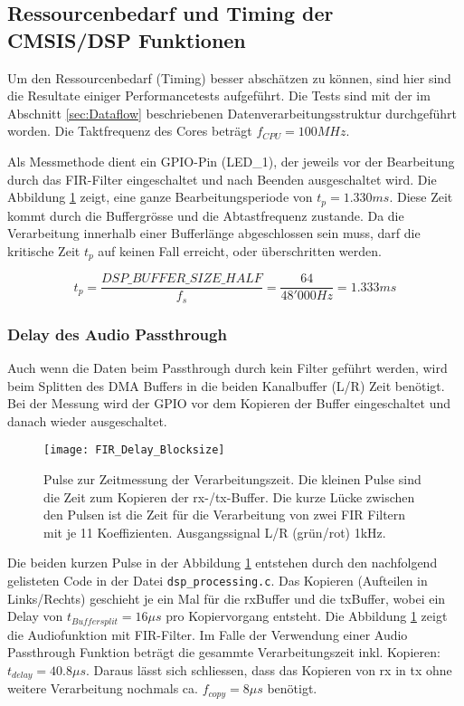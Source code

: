 \subsection{Ressourcenbedarf und Timing der CMSIS/DSP Funktionen}
\label{sec:DSP_Timing}

Um den Ressourcenbedarf (Timing) besser abschätzen zu können, sind hier sind die Resultate einiger Performancetests aufgeführt.
Die Tests sind mit der im Abschnitt \ref{sec:Dataflow} beschriebenen Datenverarbeitungsstruktur durchgeführt worden.
Die Taktfrequenz des Cores beträgt $f_{CPU}=100\si{MHz}$.

Als Messmethode dient ein GPIO-Pin (LED\_1), der jeweils vor der Bearbeitung durch das FIR-Filter eingeschaltet und nach Beenden ausgeschaltet wird. 
Die Abbildung \ref{pic:FIR_Delay_Blocksize} zeigt, eine ganze Bearbeitungsperiode von $t_p=1.330\si{ms}$.
Diese Zeit kommt durch die Buffergrösse und die Abtastfrequenz zustande.
Da die Verarbeitung innerhalb einer Bufferlänge abgeschlossen sein muss, darf die 
kritische Zeit $t_p$ auf keinen Fall erreicht, oder überschritten werden.

\begin{equation}
	t_p=\frac{DSP\_BUFFER\_SIZE\_HALF}{f_s}=\frac{64}{48'000\si{Hz}}=1.333\si{ms}
\end{equation}


\subsubsection{Delay des Audio Passthrough}

Auch wenn die Daten beim Passthrough durch kein Filter geführt werden, wird beim Splitten des DMA Buffers in die beiden Kanalbuffer (L/R) Zeit benötigt.
Bei der Messung wird der GPIO vor dem Kopieren der Buffer eingeschaltet und danach wieder ausgeschaltet.

\begin{figure}[H]
	\centering
	\texttt{[image: FIR\_Delay\_Blocksize]}
	\caption{Pulse zur Zeitmessung der Verarbeitungszeit. Die kleinen Pulse sind die Zeit zum Kopieren der rx-/tx-Buffer. Die kurze Lücke zwischen den Pulsen ist die Zeit für die Verarbeitung von zwei FIR Filtern mit je 11 Koeffizienten. Ausgangssignal L/R (grün/rot) 1kHz.}
	\label{pic:FIR_Delay_Blocksize}
\end{figure}

Die beiden kurzen Pulse in der Abbildung \ref{pic:FIR_Delay_Blocksize} entstehen durch den nachfolgend gelisteten Code in der Datei \texttt{dsp\_processing.c}.
Das Kopieren (Aufteilen in Links/Rechts) geschieht je ein Mal für die rxBuffer und die txBuffer, wobei ein Delay von $t_{Buffersplit}=16\mu\si{s}$ pro Kopiervorgang entsteht.
Die Abbildung \ref{pic:FIR_Delay_Blocksize} zeigt die Audiofunktion mit FIR-Filter. Im Falle der Verwendung einer Audio Passthrough Funktion beträgt die gesammte Verarbeitungszeit
inkl. Kopieren: $t_{delay}=40.8\mu\si{s}$. Daraus lässt sich schliessen, dass das Kopieren 
von rx in tx ohne weitere Verarbeitung nochmals ca. $f_{copy}=8\mu\si{s}$ benötigt.\\

